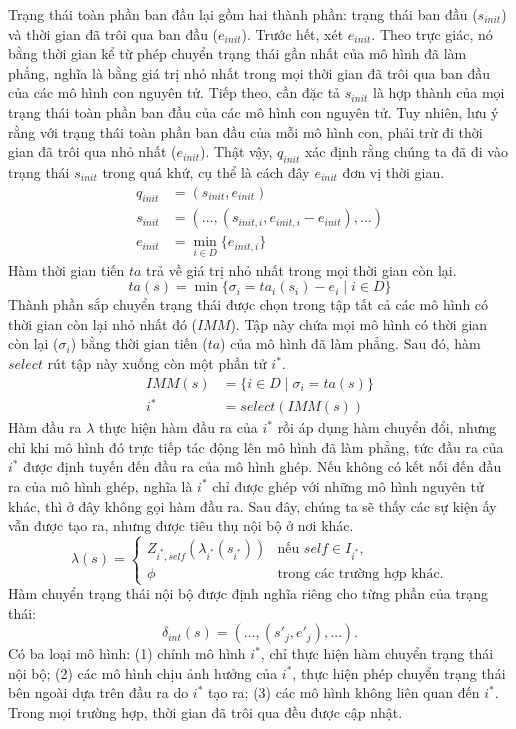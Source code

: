 Trạng thái toàn phần ban đầu lại gồm hai thành phần: trạng thái ban đầu ($s_{init}$) và thời gian đã trôi qua ban đầu ($e_{init}$). Trước hết, xét $e_{init}$. Theo trực giác, nó bằng thời gian kể từ phép chuyển trạng thái gần nhất của mô hình đã làm phẳng, nghĩa là bằng giá trị nhỏ nhất trong mọi thời gian đã trôi qua ban đầu của các mô hình con nguyên tử. Tiếp theo, cần đặc tả $s_{init}$ là hợp thành của mọi trạng thái toàn phần ban đầu của các mô hình con nguyên tử. Tuy nhiên, lưu ý rằng với trạng thái toàn phần ban đầu của mỗi mô hình con, phải trừ đi thời gian đã trôi qua nhỏ nhất ($e_{init}$). Thật vậy, $q_{init}$ xác định rằng chúng ta đã đi vào trạng thái $s_{init}$ trong quá khứ, cụ thể là cách đây $e_{init}$ đơn vị thời gian.
\begin{align*}
q_{init}&=(s_{init},e_{init})\\
s_{init}&=(\ldots,(s_{init,i},e_{init,i}-e_{init}),\ldots)\\
e_{init}&=\min_{i\in D}\{e_{init,i}\}
\end{align*}
Hàm thời gian tiến $ta$ trả về giá trị nhỏ nhất trong mọi thời gian còn lại.
\[
ta(s)=\min\{\sigma_i=ta_i(s_i)-e_i\mid i\in D\}
\]
Thành phần sắp chuyển trạng thái được chọn trong tập tất cả các mô hình có thời gian còn lại nhỏ nhất đó ($IMM$). Tập này chứa mọi mô hình có thời gian còn lại ($\sigma_i$) bằng thời gian tiến ($ta$) của mô hình đã làm phẳng. Sau đó, hàm $select$ rút tập này xuống còn một phần tử $i^*$.
\begin{align*}
IMM(s)&=\{i\in D\mid\sigma_i=ta(s)\}\\
i^*&=select(IMM(s))
\end{align*}
Hàm đầu ra $\lambda$ thực hiện hàm đầu ra của $i^*$ rồi áp dụng hàm chuyển đổi, nhưng chỉ khi mô hình đó trực tiếp tác động lên mô hình đã làm phẳng, tức đầu ra của $i^*$ được định tuyến đến đầu ra của mô hình ghép. Nếu không có kết nối đến đầu ra của mô hình ghép, nghĩa là $i^*$ chỉ được ghép với những mô hình nguyên tử khác, thì ở đây không gọi hàm đầu ra. Sau đây, chúng ta sẽ thấy các sự kiện ấy vẫn được tạo ra, nhưng được tiêu thụ nội bộ ở nơi khác.
\[
\lambda(s)=\begin{cases}
Z_{i^*,self}(\lambda_{i^*}(s_{i^*}))&\text{nếu }self\in I_{i^*},\\
\phi&\text{trong các trường hợp khác.}
\end{cases}
\]
Hàm chuyển trạng thái nội bộ được định nghĩa riêng cho từng phần của trạng thái:
\[
\delta_{int}(s)=(\ldots,(s'_j,e'_j),\ldots).
\]
Có ba loại mô hình: (1) chính mô hình $i^*$, chỉ thực hiện hàm chuyển trạng thái nội bộ; (2) các mô hình chịu ảnh hưởng của $i^*$, thực hiện phép chuyển trạng thái bên ngoài dựa trên đầu ra do $i^*$ tạo ra; (3) các mô hình không liên quan đến $i^*$. Trong mọi trường hợp, thời gian đã trôi qua đều được cập nhật.
